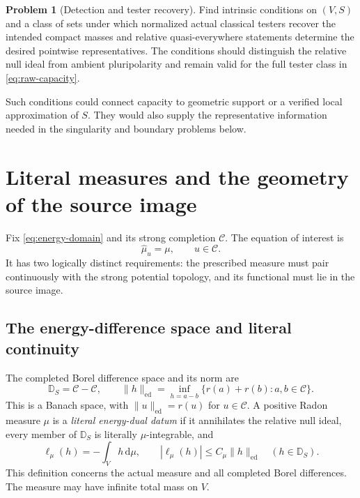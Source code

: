 \documentclass[11pt,a4paper]{article}
\newcommand{\MathEqref}[1]{{\hypersetup{linkcolor=EquationLink}\eqref{#1}}}
\theoremstyle{definition}
\newtheorem{problem}[theorem]{Problem}
\theoremstyle{remark}
\numberwithin{equation}{section}
\newcommand{\dd}{\mathrm d}
\newcommand{\ed}{\mathrm{ed}}
\newcommand{\C}{\mathscr C}
\begin{document}
\begin{problem}[Detection and tester recovery]
\label{problem:tester}
Find intrinsic conditions on $(V,S)$ and a class of sets under which
normalized actual classical testers recover the intended compact
masses and relative quasi-everywhere statements determine the desired
pointwise representatives.  The conditions should distinguish the
relative null ideal from ambient pluripolarity and remain valid for
the full tester class in \MathEqref{eq:raw-capacity}.
\end{problem}

Such conditions could connect capacity to geometric support or a
verified local approximation of $S$.  They would also supply the
representative information needed in the singularity and boundary
problems below.

\section{Literal measures and the geometry of the source image}
\label{sec:sources}

Fix \MathEqref{eq:energy-domain} and its strong completion $\C$.  The
equation of interest is
\begin{equation}
                              \widehat\mu_u=\mu,\qquad u\in\C.
                         \label{eq:source-equation}
\end{equation}
It has two logically distinct requirements: the prescribed measure
must pair continuously with the strong potential topology, and its
functional must lie in the source image.

\subsection{The energy-difference space and literal continuity}

The completed Borel difference space and its norm are
\begin{equation}
 \mathbb D_S=\C-\C,\qquad
 \|h\|_{\ed}=\inf_{h=a-b}\{r(a)+r(b):a,b\in\C\}.
                         \label{eq:ed-norm}
\end{equation}
This is a Banach space, with $\|u\|_{\ed}=r(u)$ for $u\in\C$.
A positive Radon measure $\mu$ is a \emph{literal energy-dual datum}
if it annihilates the relative null ideal, every member of
$\mathbb D_S$ is literally $\mu$-integrable, and
\begin{equation}
 \ell_\mu(h)=-\int_Vh\,\dd\mu,
 \qquad |\ell_\mu(h)|\le C_\mu\|h\|_{\ed}
                       \quad(h\in\mathbb D_S).
                         \label{eq:literal-ed}
\end{equation}
This definition concerns the actual measure and all completed Borel
differences.  The measure may have infinite total mass on $V$.
\end{document}
